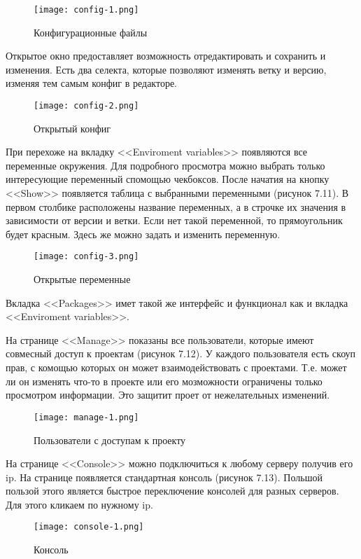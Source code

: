 \begin{figure}[h!]
\centering
	\texttt{[image: config-1.png]}
	\caption{Конфигурационные файлы}
	\clearpage
\end{figure}

Открытое окно предоставляет возможность отредактировать и сохранить и изменения. Есть два селекта, которые позволяют изменять ветку и версию, изменяя тем самым конфиг в редакторе. 

\begin{figure}[h!]
\centering
	\texttt{[image: config-2.png]}
	\caption{Открытый конфиг}
	\clearpage
\end{figure}

При перехоже на вкладку <<Enviroment variables>> появляются все переменные окружения. Для подробного просмотра можно выбрать только интересующие переменный спомощью чекбоксов. После начатия на кнопку <<Show>> появляется таблица с выбранными переменными (рисунок 7.11). В первом столбике расположены название переменных, а в строчке их значения в зависимости от версии и ветки. Если нет такой переменной, то прямоугольник будет красным. Здесь же можно задать и изменить переменную.

\begin{figure}[h!]
\centering
	\texttt{[image: config-3.png]}
	\caption{Открытые переменные}
	\clearpage
\end{figure}

Вкладка <<Packages>> имет такой же интерфейс и функционал как и вкладка <<Enviroment variables>>.

На странице <<Manage>> показаны все пользователи, которые имеют совмесный доступ к проектам (рисунок 7.12). У каждого пользователя есть скоуп прав, с комощью которых он может взаимодействовать с проектами. Т.е. может ли он изменять что-то в проекте или его мозможности ограничены только просмотром информации. Это защитит проет от нежелательных изменений.  

\begin{figure}[h!]
\centering
	\texttt{[image: manage-1.png]}
	\caption{Пользователи с доступам к проекту}
	\clearpage
\end{figure}

На странице <<Console>> можно подключиться к любому серверу получив его ip. На странице появляется стандартная консоль (рисунок 7.13). Польшой пользой этого является быстрое переключение консолей для разных серверов. Для этого кликаем по нужному ip.   

\begin{figure}[h!]
\centering
	\texttt{[image: console-1.png]}
	\caption{Консоль}
	\clearpage
\end{figure}
